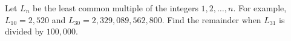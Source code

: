 Let $L_n$ be the least common multiple of the integers $1,2,\dots,n$. For example, $L_{10} = 2{,}520$ and $L_{30} = 2{,}329{,}089{,}562{,}800$. Find the remainder when $L_{31}$ is divided by $100{,}000$.
